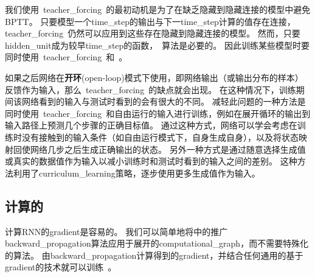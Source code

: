 我们使用~\gls{teacher_forcing}~的最初动机是为了在缺乏隐藏到隐藏连接的模型中避免\gls{BPTT}。
只要模型一个\gls{time_step}的输出与下一\gls{time_step}计算的值存在连接，\gls{teacher_forcing}~仍然可以应用到这些存在隐藏到隐藏连接的模型。
然而，只要\gls{hidden_unit}成为较早\gls{time_step}的函数，~算法是必要的。
因此训练某些模型时要同时使用~\gls{teacher_forcing}~和~。


如果之后网络在\textbf{开环}(open-loop)模式下使用，即网络输出（或输出分布的样本）反馈作为输入，那么~\gls{teacher_forcing}~的缺点就会出现。
在这种情况下，训练期间该网络看到的输入与测试时看到的会有很大的不同。
减轻此问题的一种方法是同时使用~\gls{teacher_forcing}~和自由运行的输入进行训练，例如在展开循环的输出到输入路径上预测几个步骤的正确目标值。
通过这种方式，网络可以学会考虑在训练时没有接触到的输入条件（如自由运行模式下，自身生成自身），以及将状态映射回使网络几步之后生成正确输出的状态。
另外一种方式\citep{SamyBengio-et-al-arxiv2015}是通过随意选择生成值或真实的数据值作为输入以减小训练时和测试时看到的输入之间的差别。
这种方法利用了\gls{curriculum_learning}策略，逐步使用更多生成值作为输入。

\subsection{计算的}
\label{sec:computing_the_gradient_in_a_recurrent_neural_network}
计算\gls{RNN}的\gls{gradient}是容易的。
我们可以简单地将中的推广\gls{backward_propagation}算法应用于展开的\gls{computational_graph}，而不需要特殊化的算法。
由\gls{backward_propagation}计算得到的\gls{gradient}，并结合任何通用的基于\gls{gradient}的技术就可以训练~。

